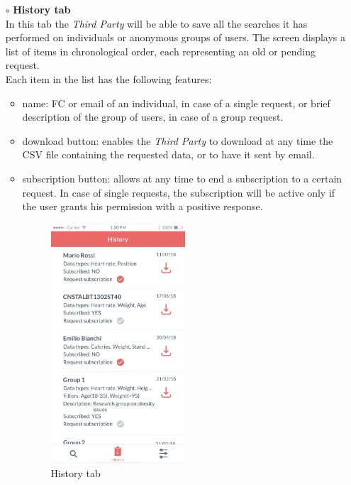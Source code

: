 \documentclass[titlepage]{article}
\begin{document}
\begin{itemize}
\begin{itemize}
\begin{itemize}
					\item[$\circ$] {\bf History tab}\\
				In this tab the {\it Third Party} will be able to save all the searches it has performed on individuals or anonymous groups of users. The screen displays a list of items in chronological order, each representing an old or pending request.\\
Each item in the list has the following features:
						\begin{itemize}
							\item name: FC or email of an individual, in case of a single request, or brief description of the group of users, in case of a group request.
							\item download button: enables the {\it Third Party} to download at any time the CSV file containing the requested data, or to have it sent by email.
							\item subscription button: allows at any time to end a subscription to a certain request. In case of single requests, the subscription will be active only if the user grants his permission with a positive response.\\
					\begin{figure}[H]
						\center
  						\includegraphics[width=5cm]{Mockup/mockupHistory.png}
  						\caption{History tab}
 					 	\label{fig:Hist}
					\end{figure}
						\end{itemize}
						


\end{itemize}
\end{itemize}
\end{itemize}
\end{document}
